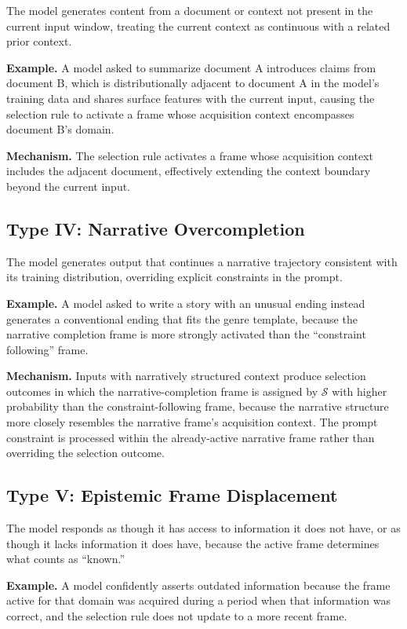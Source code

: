 \documentclass[12pt]{article}
\begin{document}
The model generates content from a document or context not present
in the current input window, treating the current context as
continuous with a related prior context.

\textbf{Example.} A model asked to summarize document A introduces
claims from document B, which is distributionally adjacent to
document A in the model's training data and shares surface features
with the current input, causing the selection rule to activate a
frame whose acquisition context encompasses document B's domain.

\textbf{Mechanism.} The selection rule activates a frame whose
acquisition context includes the adjacent document, effectively
extending the context boundary beyond the current input.

\subsection{Type IV: Narrative Overcompletion}

The model generates output that continues a narrative trajectory
consistent with its training distribution, overriding explicit
constraints in the prompt.

\textbf{Example.} A model asked to write a story with an unusual
ending instead generates a conventional ending that fits the
genre template, because the narrative completion frame is more
strongly activated than the ``constraint following'' frame.

\textbf{Mechanism.} Inputs with narratively structured context
produce selection outcomes in which the narrative-completion frame
is assigned by $\mathcal{S}$ with higher probability than the
constraint-following frame, because the narrative structure more
closely resembles the narrative frame's acquisition context.
The prompt constraint is processed within the already-active
narrative frame rather than overriding the selection outcome.

\subsection{Type V: Epistemic Frame Displacement}

The model responds as though it has access to information it does
not have, or as though it lacks information it does have, because
the active frame determines what counts as ``known.''

\textbf{Example.} A model confidently asserts outdated information
because the frame active for that domain was acquired during a
period when that information was correct, and the selection rule
does not update to a more recent frame.
\end{document}
